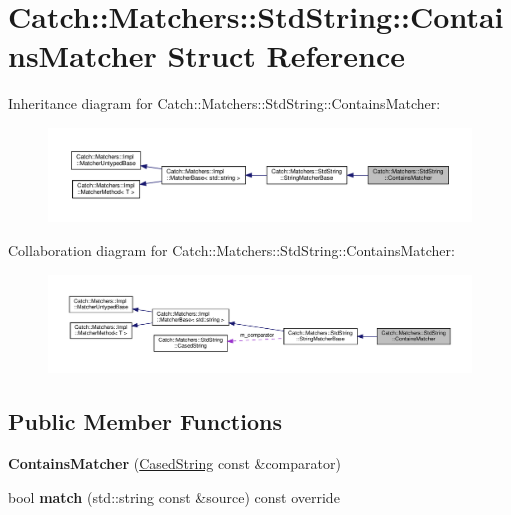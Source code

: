 \hypertarget{structCatch_1_1Matchers_1_1StdString_1_1ContainsMatcher}{}\section{Catch\+::Matchers\+::Std\+String\+::Contains\+Matcher Struct Reference}
\label{structCatch_1_1Matchers_1_1StdString_1_1ContainsMatcher}


Inheritance diagram for Catch\+::Matchers\+::Std\+String\+::Contains\+Matcher\+:
\nopagebreak
\begin{figure}[H]
\begin{center}
\leavevmode
\includegraphics[width=350pt]{structCatch_1_1Matchers_1_1StdString_1_1ContainsMatcher__inherit__graph}
\end{center}
\end{figure}


Collaboration diagram for Catch\+::Matchers\+::Std\+String\+::Contains\+Matcher\+:
\nopagebreak
\begin{figure}[H]
\begin{center}
\leavevmode
\includegraphics[width=350pt]{structCatch_1_1Matchers_1_1StdString_1_1ContainsMatcher__coll__graph}
\end{center}
\end{figure}
\subsection*{Public Member Functions}
\begin{DoxyCompactItemize}
\item 
\mbox{\label{structCatch_1_1Matchers_1_1StdString_1_1ContainsMatcher_acc892883c8409e34b28c9b39d4ef1fe3}} 
{\bfseries Contains\+Matcher} (\mbox{\hyperlink{structCatch_1_1Matchers_1_1StdString_1_1CasedString}{Cased\+String}} const \&comparator)
\item 
\mbox{\label{structCatch_1_1Matchers_1_1StdString_1_1ContainsMatcher_a630628b234b037be83fe587081a80b53}} 
bool {\bfseries match} (std\+::string const \&source) const override
\end{DoxyCompactItemize}
